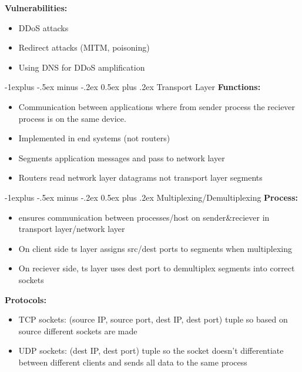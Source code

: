 \documentclass[letterpaper, 8pt]{extarticle}
\makeatletter
\renewcommand{\section}{\@startsection{section}{1}{0mm}%
                                {-1explus -.5ex minus -.2ex}%
                                {0.5ex plus .2ex}%
                                {\normalfont\normalsize\bfseries}}
\renewcommand{\subsection}{\@startsection{subsection}{2}{0mm}%
                                {-1explus -.5ex minus -.2ex}%
                                {0.5ex plus .2ex}%
                                {\normalfont\small\bfseries}}
\makeatother
\begin{document}
\begin{multicols*}{4}
	\textbf{Vulnerabilities:}
	\begin{itemize}
		\item DDoS attacks
		\item Redirect attacks (MITM, poisoning)
		\item Using DNS for DDoS amplification
	\end{itemize}

	\section{Transport Layer}
	\textbf{Functions:}
	\begin{itemize}
		\item Communication between applications where from sender process the reciever process is on the same device.
		\item Implemented in end systems (not routers)
		\item Segments application messages and pass to network layer
		\item Routers read network layer datagrams not transport layer segments
	\end{itemize}

	\subsection{Multiplexing/Demultiplexing}
	\textbf{Process:}
	\begin{itemize}
		\item ensures communication between processes/host on sender\&reciever in transport layer/network layer
		\item On client side ts layer assigns src/dest ports to segments when multiplexing
		\item On reciever side, ts layer uses dest port to demultiplex segments into correct sockets
	\end{itemize}

	\textbf{Protocols:}
	\begin{itemize}
		\item TCP sockets: (source IP, source port, dest IP, dest port) tuple so based on source different sockets are made
		\item UDP sockets: (dest IP, dest port) tuple so the socket doesn't differentiate between different clients and sends all data to the same process
	\end{itemize}




\end{multicols*}
\end{document}
